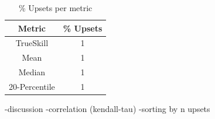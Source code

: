 \begin{table}[H]
\centering
\begin{tabular}{|| c | c ||} 
 \hline
 Metric & \% Upsets \\ [0.5ex] 
 \hline\hline
    TrueSkill & 1 \\
    Mean & 1 \\
    Median & 1 \\
    20-Percentile & 1 \\ [1ex]
 \hline
\end{tabular}
\label{MetricsUpsets}
\caption{\% Upsets per metric}
\end{table}

\begin{code}
    -discussion
    -correlation (kendall-tau)
    -sorting by n upsets
\end{code}

